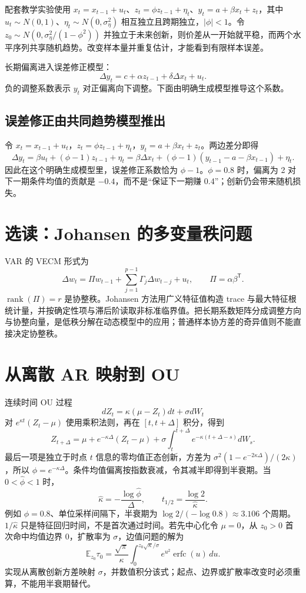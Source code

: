 配套教学实验使用 $x_t=x_{t-1}+u_t$、$z_t=\phi z_{t-1}+\eta_t$、$y_t=a+\beta x_t+z_t$，其中 $u_t\sim N(0,1)$、$\eta_t\sim N(0,\sigma_\eta^2)$ 相互独立且跨期独立，$|\phi|<1$。令 $z_0\sim N(0,\sigma_\eta^2/(1-\phi^2))$ 并独立于未来创新，则价差从一开始就平稳，而两个水平序列共享随机趋势。改变样本量并重复估计，才能看到有限样本误差。



长期偏离进入误差修正模型：
\[
\Delta y_t=c+\alpha z_{t-1}+\delta\Delta x_t+u_t.
\]
负的调整系数表示 $y_t$ 对正偏离向下调整。下面由明确生成模型推导这个系数。

\subsection{误差修正由共同趋势模型推出}

令 $x_t=x_{t-1}+u_t$，$z_t=\phi z_{t-1}+\eta_t$，$y_t=a+\beta x_t+z_t$。两边差分即得
\[
 \Delta y_t=\beta u_t+(\phi-1)z_{t-1}+\eta_t
 =\beta\Delta x_t+(\phi-1)(y_{t-1}-a-\beta x_{t-1})+\eta_t.
\]
因此在这个明确生成模型里，误差修正系数恰为 $\phi-1$。$\phi=0.8$ 时，偏离为 2 对下一期条件均值的贡献是 $-0.4$，而不是“保证下一期赚 0.4”；创新仍会带来随机损失。


\section{选读：Johansen 的多变量秩问题}

VAR 的 VECM 形式为
\[
\Delta w_t=\Pi w_{t-1}+\sum_{j=1}^{p-1}\Gamma_j\Delta w_{t-j}+u_t,
\qquad \Pi=\alpha\beta^{\mathsf T}.
\]
$\operatorname{rank}(\Pi)=r$ 是协整秩。Johansen 方法用广义特征值构造 trace 与最大特征根统计量，并按确定性项与滞后阶读取非标准临界值\cite{johansen1991estimation}。把长期系数矩阵分成调整方向与协整向量，是低秩分解在动态模型中的应用；普通样本协方差的奇异值则不能直接决定协整秩。

\section{从离散 AR 映射到 OU}

连续时间 OU 过程
\[
dZ_t=\kappa(\mu-Z_t)dt+\sigma dW_t
\]
对 $e^{\kappa t}(Z_t-\mu)$ 使用乘积法则，再在 $[t,t+\Delta]$ 积分，得到
\[
Z_{t+\Delta}=\mu+e^{-\kappa\Delta}(Z_t-\mu)
+\sigma\int_t^{t+\Delta}e^{-\kappa(t+\Delta-s)}dW_s.
\]
最后一项是独立于时点 $t$ 信息的零均值正态创新，方差为 $\sigma^2(1-e^{-2\kappa\Delta})/(2\kappa)$，所以 $\phi=e^{-\kappa\Delta}$。条件均值偏离按指数衰减，令其减半即得到半衰期。当 $0<\hat\phi<1$ 时，
\[
\hat\kappa=-\frac{\log\hat\phi}{\Delta},
\qquad t_{1/2}=\frac{\log 2}{\hat\kappa}.
\]
例如 $\phi=0.8$、单位采样间隔下，半衰期为 $\log2/(-\log0.8)\approx3.106$ 个周期。$1/\hat\kappa$ 只是特征回归时间，不是首次通过时间。若先中心化令 $\mu=0$，从 $z_0>0$ 首次命中均值边界 0，扩散率为 $\sigma$，边值问题的解为
\[
\mathbb E_{z_0}\tau_0
=\frac{\sqrt\pi}{\kappa}
\int_0^{z_0\sqrt\kappa/\sigma}e^{u^2}\operatorname{erfc}(u)\,du.
\]
实现从离散创新方差映射 $\sigma$，并数值积分该式；起点、边界或扩散率改变时必须重算，不能用半衰期替代。

